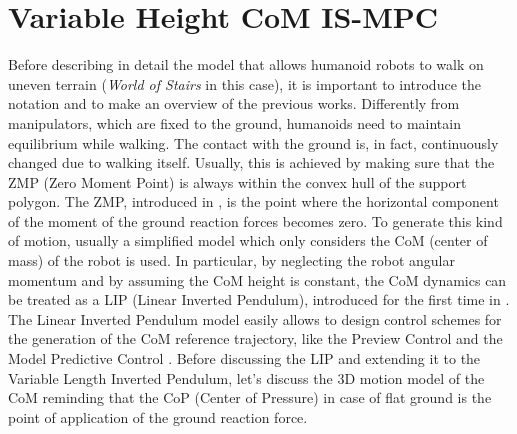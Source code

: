 \chapter{Variable Height CoM IS-MPC}
Before describing in detail the model \cite{SYROCO18} that allows humanoid 
robots to walk on uneven terrain (\textit{World of Stairs} in this case),
it is important to introduce the notation and 
to make an overview of the previous works.
Differently from manipulators, which are fixed to the ground, humanoids need 
to maintain equilibrium while walking. The contact with the ground is, in fact,
continuously changed due to walking itself. Usually, this is achieved by 
making sure that the ZMP (Zero Moment Point) is always within the convex hull 
of the support polygon. The ZMP, introduced in \cite{VUKOBRATOVIC19721}, is the 
point where the horizontal component of the moment of the ground reaction forces
becomes zero. To generate this kind of motion, usually a simplified model 
which only considers the CoM (center of mass) of the robot is used.
In particular, by neglecting the robot angular momentum and by assuming the 
CoM height is constant, the CoM dynamics can be treated as a LIP (Linear 
Inverted Pendulum), introduced for the first time in \cite{Kajita1991StudyOD}.
The Linear Inverted Pendulum model easily allows to design control schemes for 
the generation of the CoM reference trajectory, like the Preview Control 
\cite{Kajita2003BipedWP} and the Model Predictive Control
\cite{wieber:inria-00390462}.
Before discussing the LIP and extending it to the Variable Length Inverted
Pendulum, let's discuss the 3D motion model of the CoM reminding that the CoP
(Center of Pressure) in case of flat ground is the point of application of
the ground reaction force.

